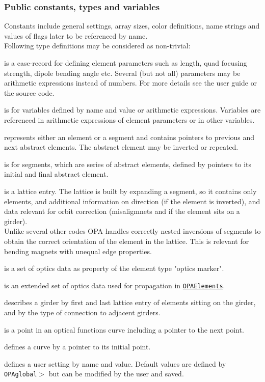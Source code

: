 \documentclass[12pt]{article}
\newcommand\code[1]{{\tt #1}}
\newcommand{\unico}[1]{{\color{burntorange}\code{#1}}}
\newcommand{\prcod}[2]{\opauni{#1}$>$\unico{#2}}
\newcommand{\opauni}[1]{\colorbox{orange!30}{\code{#1}}}
\newcommand{\ouni}[1]{\hyperref[#1]{\opauni{#1}}}
\newcommand{\pvar}[1]{\subsubsection*{Public constants, types and variables} #1}
\newcommand{\feature}[1]{{\color{cadmiumgreen} #1}}
\begin{document}
\pvar{
Constants include general settings, array sizes, color definitions, name strings and values of flags later to be referenced by name.\\

Following type definitions may be considered as non-trivial:

\unico{ElementType} is a case-record for defining element parameters such as length, quad focusing strength, dipole bending angle etc. Several (but not all) parameters may be arithmetic expressions instead of numbers. For more details see the user guide \cite{userguide} or the source code. 

\unico{variable\_type} is for variables defined by name and value or arithmetic expressions. Variables are referenced in arithmetic expressions of element parameters or in other variables.

\unico{AbstractEleType} represents either an element or a segment and contains pointers to previous and next abstract elements. The abstract element may be inverted or repeated.

\unico{SegmentType} is for segments, which are series of abstract elements, defined by pointers to its initial and final abstract element.

\unico{LatticeType} is a lattice entry. The lattice is built by expanding a segment, so it contains only elements, and additional information on direction (if the element is inverted), and data relevant for orbit correction (misaligmnets and if the element sits on a girder). \\
\feature{Unlike several other codes OPA handles correctly nested inversions of segments to obtain the correct orientation of the element in the lattice. This is relevant for bending magnets with unequal edge properties.}

\unico{OmarkType} is a set of optics data as property of the element type "optics marker".

\unico{OpValType} is an extended set of optics data used for propagation in \ouni{OPAElements}.

\unico{GirderType} describes a girder by first and last lattice entry of elements sitting on the girder, and by the type of connection to adjacent girders.

\unico{CurveType} is a point in an optical functions curve including a pointer to the next point.

\unico{CurvePlotType} defines a curve by a pointer to its initial point.

\unico{DefaultType} defines a user setting by name and value. Default values are defined by \\ \prcod{OPAglobal}{Initialization} but can be modified by the user and saved.

}
\end{document}
